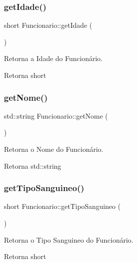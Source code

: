 \subsubsection{\texorpdfstring{get\+Idade()}{getIdade()}}
{\footnotesize\ttfamily short Funcionario\+::get\+Idade (\begin{DoxyParamCaption}{ }\end{DoxyParamCaption})}



Retorna a Idade do Funcionário. 

\begin{DoxyReturn}{Retorna}
short 
\end{DoxyReturn}
\mbox{\label{classFuncionario_a35376709ae5c7357e79ca612a74e7f15}} 
\subsubsection{\texorpdfstring{get\+Nome()}{getNome()}}
{\footnotesize\ttfamily std\+::string Funcionario\+::get\+Nome (\begin{DoxyParamCaption}{ }\end{DoxyParamCaption})}



Retorna o Nome do Funcionário. 

\begin{DoxyReturn}{Retorna}
std\+::string 
\end{DoxyReturn}
\mbox{\label{classFuncionario_aa25f7aa3d2da9cda7081f262793ecad7}} 
\subsubsection{\texorpdfstring{get\+Tipo\+Sanguineo()}{getTipoSanguineo()}}
{\footnotesize\ttfamily short Funcionario\+::get\+Tipo\+Sanguineo (\begin{DoxyParamCaption}{ }\end{DoxyParamCaption})}



Retorna o Tipo Sanguineo do Funcionário. 

\begin{DoxyReturn}{Retorna}
short 
\end{DoxyReturn}
\mbox{\label{classFuncionario_a696332cf5ccde3a31f84e5af687e7ec2}} 
